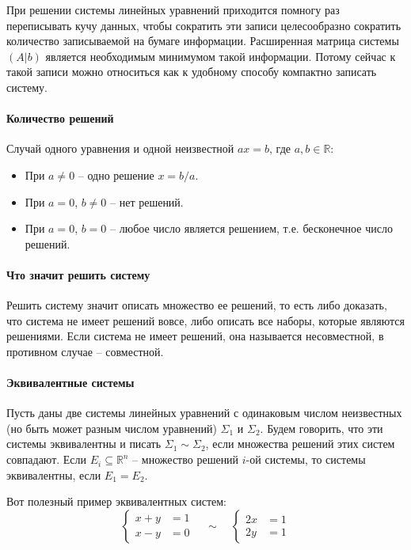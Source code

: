 При решении системы линейных уравнений приходится помногу раз переписывать кучу данных, чтобы сократить эти записи целесообразно сократить количество записываемой на бумаге информации.
Расширенная матрица системы $(A|b)$ является необходимым минимумом такой информации.
Потому сейчас к такой записи можно относиться как к удобному способу компактно записать систему.

\paragraph{Количество решений}

Случай одного уравнения и одной неизвестной $ax = b$, где $a, b\in \mathbb R$:
\begin{itemize}
\item При $a\neq 0$ -- одно решение $x = b/a$.

\item При $a = 0$, $b\neq 0$ -- нет решений.

\item При $a = 0$, $b = 0$ -- любое число является решением, т.е. бесконечное число решений.
\end{itemize}

\paragraph{Что значит решить систему}

Решить систему значит описать множество ее решений, то есть либо доказать, что система не имеет решений вовсе, либо описать все наборы, которые являются решениями.
Если система не имеет решений, она называется несовместной, в противном случае -- совместной.

\paragraph{Эквивалентные системы}

Пусть даны две системы линейных уравнений с одинаковым числом неизвестных (но быть может разным числом уравнений) $\Sigma_1$ и $\Sigma_2$.
Будем говорить, что эти системы эквивалентны и писать $\Sigma_1 \sim \Sigma_2$, если множества решений этих систем совпадают.
Если $E_i\subseteq \mathbb R^n$ -- множество решений $i$-ой системы, то системы эквивалентны, если $E_1 = E_2$.

Вот полезный пример эквивалентных систем:
\[
\left\{
\begin{aligned}
x + y &= 1\\
x - y &= 0
\end{aligned}
\right.\quad\sim\quad
\left\{
\begin{aligned}
2x &= 1\\
2y &= 1
\end{aligned}
\right.
\]

